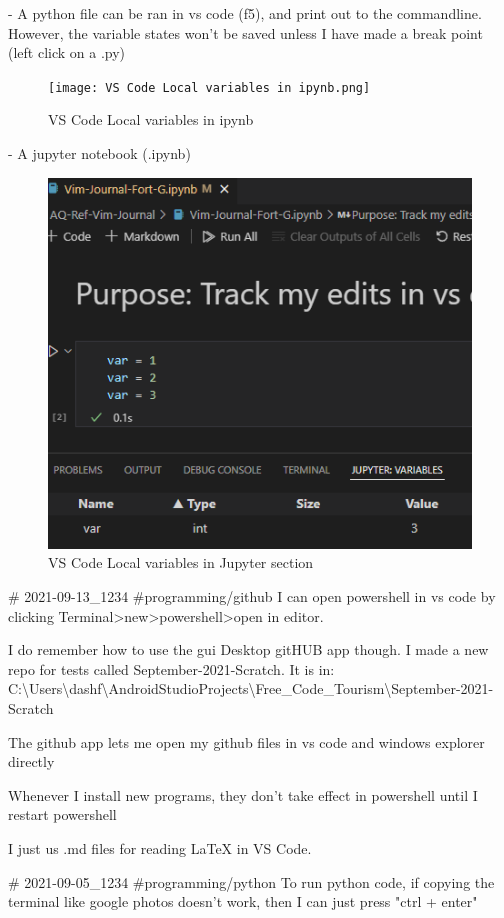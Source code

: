 - A python file can be ran in vs code (f5), and print out to the commandline. However, the variable states won't be saved unless I have made a break point (left click on a .py)
\begin{figure}
    \centering
    \texttt{[image: VS Code Local variables in ipynb.png]}
    \caption{VS Code Local variables in ipynb}
\end{figure}
- A jupyter notebook (.ipynb)
\begin{figure}
    \centering
    \includegraphics[width=0.5\linewidth]{VS Code Local variables in Jupyter section.png}
    \caption{VS Code Local variables in Jupyter section}
\end{figure}

# 2021-09-13_1234
#programming/github
I can open powershell in vs code by clicking Terminal\textgreater new\textgreater powershell\textgreater open in editor. 


I do remember how to use the gui Desktop gitHUB app though. I made a new
repo for tests called September-2021-Scratch. It is in:
C:\textbackslash Users\textbackslash dashf\textbackslash AndroidStudioProjects\textbackslash Free\_Code\_Tourism\textbackslash September-2021-Scratch

The github app lets me open my github files in vs code and windows
explorer directly

Whenever I install new programs, they don't take effect in powershell
until I restart powershell

I just us .md files for reading LaTeX in VS Code.

# 2021-09-05_1234
#programming/python
To run python code, if copying the terminal like google photos doesn't
work, then I can just press "ctrl + enter"

